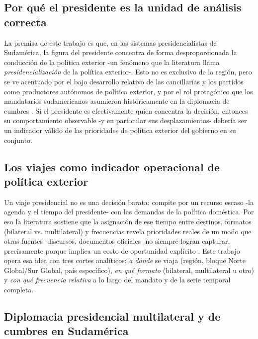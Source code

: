 \documentclass[11pt,a4paper]{article}
\begin{document}
\subsection*{Por qu\'e el presidente es la unidad de an\'alisis correcta}

La premisa de este trabajo es que, en los sistemas presidencialistas de Sudam\'erica, la figura del presidente concentra de forma desproporcionada la conducci\'on de la pol\'itica exterior -un fen\'omeno que la literatura llama \emph{presidencializaci\'on} de la pol\'itica exterior-. Esto no es exclusivo de la regi\'on, pero se ve acentuado por el bajo desarrollo relativo de las cancillar\'ias y los partidos como productores aut\'onomos de pol\'itica exterior, y por el rol protag\'onico que los mandatarios sudamericanos asumieron hist\'oricamente en la diplomacia de cumbres \citep{casonPresidentializationPluralizationRollback2009, amorimnetoPolicyMakingCapacityForeign2019, amorimnetoPresidentialDelegationForeign2020, barnabeItamaratyDiplomaciaPresidencial2010, burgesImportancePresidentialLeadership2017}. Si el presidente es efectivamente quien concentra la decisi\'on, entonces su comportamiento observable -y en particular sus desplazamientos- deber\'ia ser un indicador v\'alido de las prioridades de pol\'itica exterior del gobierno en su conjunto.

\subsection*{Los viajes como indicador operacional de pol\'itica exterior}

Un viaje presidencial no es una decisi\'on barata: compite por un recurso escaso -la agenda y el tiempo del presidente- con las demandas de la pol\'itica dom\'estica. Por eso la literatura sostiene que la asignaci\'on de ese tiempo entre destinos, formatos (bilateral vs. multilateral) y frecuencias revela prioridades reales de un modo que otras fuentes -discursos, documentos oficiales- no siempre logran capturar, precisamente porque implica un costo de oportunidad expl\'icito \citep{lebovicDiplomaticCoreDeterminants2016, arasBrothersKaramazovGo2025, leeTravelAlliesAdversaries2024}. Este trabajo opera esa idea con tres cortes anal\'iticos: \emph{a d\'onde} se viaja (regi\'on, bloque Norte Global/Sur Global, pa\'is espec\'ifico), \emph{en qu\'e formato} (bilateral, multilateral u otro) y \emph{con qu\'e frecuencia relativa} a lo largo del mandato y de la serie temporal completa.

\subsection*{Diplomacia presidencial multilateral y de cumbres en Sudam\'erica}
\end{document}
